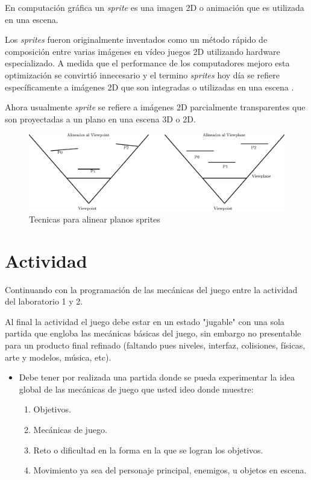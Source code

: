 En computación gráfica un \emph{sprite} es una imagen 2D o animación que es utilizada en una escena.

Los \emph{sprites} fueron originalmente inventados como un método rápido de composición entre varias imágenes en vídeo juegos 2D utilizando hardware especializado. A medida que el performance de los computadores mejoro esta optimización se convirtió innecesario y el termino \emph{sprites} hoy día se refiere específicamente a imágenes 2D que son integradas o utilizadas en una escena \cite{sprites_siggraph}.

Ahora usualmente \emph{sprite} se refiere a imágenes 2D parcialmente transparentes que son proyectadas a un plano en una escena 3D o 2D.~\\[1cm]
\begin{figure}[H]
\centering
\includegraphics[width=0.95\linewidth]{media/bills.eps} 
\caption{Tecnicas para alinear planos sprites}
\end{figure}

\section{Actividad}
Continuando con la programación de las mecánicas del juego entre la actividad del laboratorio 1 y 2.

Al final la actividad el juego debe estar en un estado "jugable" con una sola partida que engloba las mecánicas básicas del juego, sin embargo no presentable para un producto final refinado (faltando pues niveles, interfaz, colisiones, físicas, arte y modelos, música, etc).

\begin{itemize}
\item Debe tener por realizada una partida donde se pueda experimentar la idea global de las mecánicas de juego que usted ideo donde muestre:
\begin{enumerate}
  \item Objetivos.
  \item Mecánicas de juego.
  \item Reto o dificultad en la forma en la que se logran los objetivos.
  \item Movimiento ya sea del personaje principal, enemigos, u objetos en escena.
\end{enumerate}
\end{itemize}
